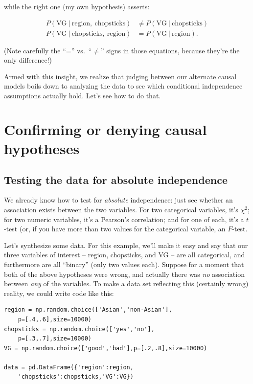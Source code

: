 while the right one (my own hypothesis) asserts:

\vspace{-.1in}
\begin{align*}
P(\textrm{VG}\ |\ \textrm{region},\ \textrm{chopsticks}) &\neq
P(\textrm{VG}\ |\ \textrm{chopsticks})\\
P(\textrm{VG}\ |\ \textrm{chopsticks},\ \textrm{region}) &=
P(\textrm{VG}\ |\ \textrm{region}).
\end{align*}

(Note carefully the ``='' vs.~``$\neq$'' signs in those equations, because
they're the only difference!)

Armed with this insight, we realize that judging between our alternate causal
models boils down to analyzing the data to see which conditional independence
assumptions actually hold. Let's see how to do that.

\section{Confirming or denying causal hypotheses}

\subsection{Testing the data for absolute independence}


We already know how to test for \textit{absolute} independence: just see
whether an association exists between the two variables. For two categorical
variables, it's $\chi ^2$; for two numeric variables, it's a Pearson's
correlation; and for one of each, it's a $t$-test (or, if you have more than
two values for the categorical variable, an $F$-test.


Let's synthesize some data. For this example, we'll make it easy and say that
our three variables of interest -- \textsf{region}, \textsf{chopsticks}, and
\textsf{VG} -- are all categorical, and furthermore are all ``binary'' (only
two values each). Suppose for a moment that both of the above hypotheses were
wrong, and actually there was \textit{no} association between \textit{any} of
the variables. To make a data set reflecting this (certainly wrong) reality, we
could write code like this:

\begin{Verbatim}[fontsize=\small,samepage=true,frame=single,framesep=3mm]
region = np.random.choice(['Asian','non-Asian'],
    p=[.4,.6],size=10000)
chopsticks = np.random.choice(['yes','no'],
    p=[.3,.7],size=10000)
VG = np.random.choice(['good','bad'],p=[.2,.8],size=10000)

data = pd.DataFrame({'region':region,
    'chopsticks':chopsticks,'VG':VG})
\end{Verbatim}
\vspace{-.2in}

